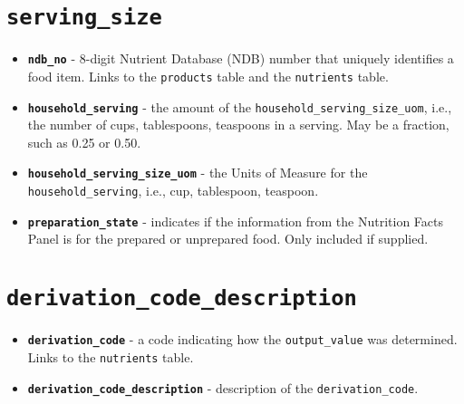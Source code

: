 \section{\texttt{serving\_size}}\label{appendix:sec:serving-size}
\begin{itemize}
    \item \textbf{\texttt{ndb\_no}} - 8-digit Nutrient Database (NDB) number that uniquely identifies a food item. Links to the \texttt{products} table and the \texttt{nutrients} table.
    \item \textbf{\texttt{household\_serving}} - the amount of the \texttt{household\_serving\_size\_uom}, i.e., the number of cups, tablespoons, teaspoons in a serving. May be a fraction, such as 0.25 or 0.50.
    \item \textbf{\texttt{household\_serving\_size\_uom}} - the Units of Measure for the \texttt{household\_serving}, i.e., cup, tablespoon, teaspoon.
    \item \textbf{\texttt{preparation\_state}} - indicates if the information from the Nutrition Facts Panel is for the prepared or unprepared food. Only included if supplied.
\end{itemize}

\section{\texttt{derivation\_code\_description}}\label{appendix:sec:dcd}
\begin{itemize}
    \item \textbf{\texttt{derivation\_code}} - a code indicating how the \texttt{output\_value} was determined. Links to the \texttt{nutrients} table.
    \item \textbf{\texttt{derivation\_code\_description}} - description of the \texttt{derivation\_code}.
\end{itemize}